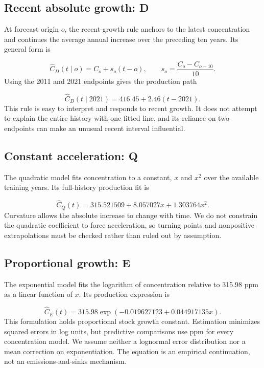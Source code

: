 \documentclass[11pt,a4paper]{article}
\newcommand{\p}[2]{#2\par}
\begin{document}
\subsection{Recent absolute growth: D}
\p{CO202}{At forecast origin $o$, the recent-growth rule anchors to the latest concentration and continues the average annual increase over the preceding ten years. Its general form is}
\begin{equation}\label{eq:drift}
\widehat C_D(t\mid o)=C_o+s_o(t-o),\qquad s_o=\frac{C_o-C_{o-10}}{10}.
\end{equation}
\p{CO203}{Using the 2011 and 2021 endpoints gives the production path}
\begin{equation}\label{eq:drift-production}
\widehat C_D(t\mid 2021)=416.45+2.46(t-2021).
\end{equation}
\p{CO204}{This rule is easy to interpret and responds to recent growth. It does not attempt to explain the entire history with one fitted line, and its reliance on two endpoints can make an unusual recent interval influential.}
\subsection{Constant acceleration: Q}
\p{CO205}{The quadratic model fits concentration to a constant, $x$ and $x^2$ over the available training years. Its full-history production fit is}
\begin{equation}\label{eq:quadratic}
\widehat C_Q(t)=315.521509+8.057027x+1.303764x^2.
\end{equation}
\p{CO206}{Curvature allows the absolute increase to change with time. We do not constrain the quadratic coefficient to force acceleration, so turning points and nonpositive extrapolations must be checked rather than ruled out by assumption.}
\subsection{Proportional growth: E}
\p{CO207}{The exponential model fits the logarithm of concentration relative to 315.98 ppm as a linear function of $x$. Its production expression is}
\begin{equation}\label{eq:exponential}
\widehat C_E(t)=315.98\exp(-0.019627123+0.044917135x).
\end{equation}
\p{CO208}{This formulation holds proportional stock growth constant. Estimation minimizes squared errors in log units, but predictive comparisons use ppm for every concentration model. We assume neither a lognormal error distribution nor a mean correction on exponentiation. The equation is an empirical continuation, not an emissions-and-sinks mechanism.}
\end{document}
